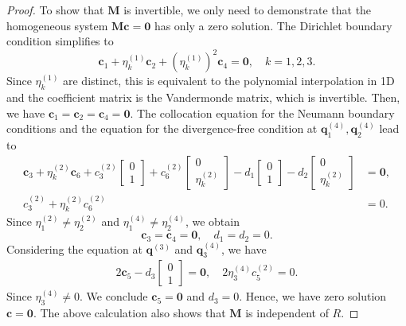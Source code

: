 \documentclass[preprint,11pt]{elsarticle}
\theoremstyle{remark}
\newcommand{\bm}[1]{\boldsymbol{#1}}
\begin{document}
\begin{proof}
To show that $\bm M$ is invertible, we only need to demonstrate that the homogeneous system $\bm M \bm c = \bm 0$ has only a zero solution.
The Dirichlet boundary condition simplifies to
\begin{equation}
    \bm c_1 + \eta_k^{(1)} \bm c_2 +  (\eta_k^{(1)} )^2\bm c_4 = \bm 0, \quad k = 1,2,3.
\end{equation}
Since $\eta_k^{(1)}$ are distinct, this is equivalent to the polynomial interpolation in 1D and the coefficient matrix is the Vandermonde matrix, which is invertible. Then, we have $\bm c_1 = \bm c_2 = \bm c_4 = \bm 0$. 
The collocation equation for the Neumann boundary conditions and the equation for the divergence-free condition at $\bm q_1^{(4)}, \bm q_2^{(4)}$ lead to
\begin{equation}
    \begin{aligned}
        \bm c_3 + \eta_k^{(2)}\bm c_6 + c_3^{(2)} 
        \begin{bmatrix}
            0\\
            1
        \end{bmatrix}
        + c_6^{(2)}
        \begin{bmatrix}
            0\\
            \eta_k^{(2)}
        \end{bmatrix}
        - d_1
        \begin{bmatrix}
            0\\
            1
        \end{bmatrix}
        -d_2
        \begin{bmatrix}
            0\\
            \eta_k^{(2)}
        \end{bmatrix} &= \bm 0, \\
    c_3^{(2)} + \eta_k^{(2)} c_6^{(2)} &= 0.
    \end{aligned}
\end{equation}
Since $\eta_1^{(2)} \neq \eta_2^{(2)}$ and $\eta_1^{(4)} \neq \eta_2^{(4)}$, we obtain
\begin{equation}
    \bm c_3 = \bm c_4=\bm 0,\quad d_1 = d_2 = 0.
\end{equation}
Considering the equation at $\bm q^{(3)}$ and $\bm q_3^{(4)}$, we have
\begin{equation}
\begin{aligned}
    2\bm c_5 - d_3 
    \begin{bmatrix}
        0 \\
        1
    \end{bmatrix} = \bm 0,\quad
    2\eta_3^{(4)} c_5^{(2)} = 0.    
\end{aligned}
\end{equation}
Since $\eta_3^{(4)}\neq 0$. We conclude $\bm c_5 = \bm 0$ and $d_3 = 0$. 
Hence, we have zero solution $\bm c =\bm 0$.
The above calculation also shows that $\bm M$ is independent of $R$.
\end{proof}
\end{document}
